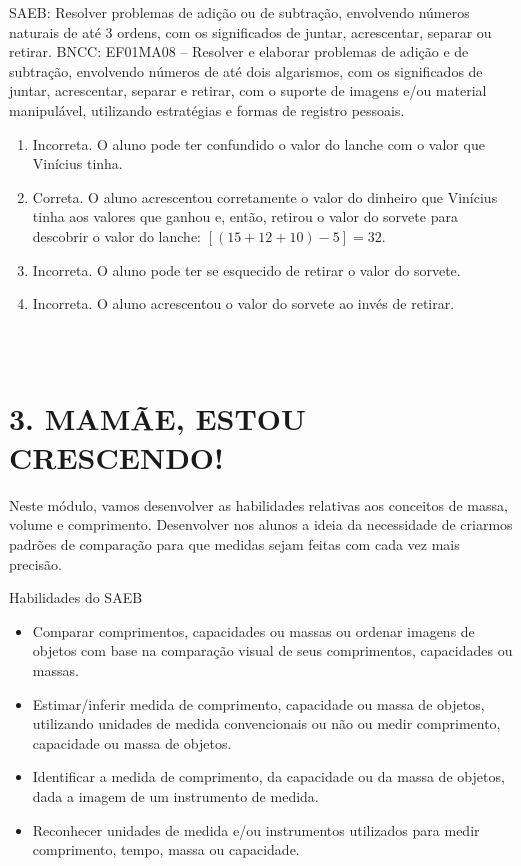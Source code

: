 SAEB: Resolver problemas de adição ou de subtração, envolvendo
números naturais de até 3 ordens, com os significados de juntar,
acrescentar, separar ou retirar.
BNCC: EF01MA08 -- Resolver e elaborar problemas de adição e de subtração,
envolvendo números de até dois algarismos, com os significados de
juntar, acrescentar, separar e retirar, com o suporte de imagens e/ou
material manipulável, utilizando estratégias e formas de registro
pessoais.

\begin{enumerate}
\def\labelenumi{\alph{enumi})}
\item
  Incorreta. O aluno pode ter confundido o valor do lanche com o valor
  que Vinícius tinha.
\item
  Correta. O aluno acrescentou corretamente o valor do dinheiro que Vinícius tinha
  aos valores que ganhou e, então, retirou o valor do sorvete para
  descobrir o valor do lanche: \([(15 + 12 + 10) - 5] = 32\).
\item
  Incorreta. O aluno pode ter se esquecido de retirar o valor do sorvete.
\item
  Incorreta. O aluno acrescentou o valor do sorvete ao invés de retirar.
\end{enumerate}

\subsubsection{\texorpdfstring{\\
}{ }}\label{section-26}

\section{3. MAMÃE, ESTOU
CRESCENDO!}\label{muxf3dulo-3-mamuxe3e-estou-crescendo}

Neste módulo, vamos desenvolver as habilidades relativas
aos conceitos de massa, volume e comprimento. Desenvolver nos alunos a
ideia da necessidade de criarmos padrões de comparação para que medidas
sejam feitas com cada vez mais precisão.

Habilidades do SAEB

\begin{itemize}
\item
  Comparar comprimentos, capacidades ou massas ou ordenar imagens de
  objetos com base na comparação visual de seus comprimentos,
  capacidades ou massas.
\item
  Estimar/inferir medida de comprimento, capacidade ou massa de objetos,
  utilizando unidades de medida convencionais ou não ou medir
  comprimento, capacidade ou massa de objetos.
\item
  Identificar a medida de comprimento, da capacidade ou da massa de
  objetos, dada a imagem de um instrumento de medida.
\item
  Reconhecer unidades de medida e/ou instrumentos utilizados para medir
  comprimento, tempo, massa ou capacidade.
\end{itemize}


